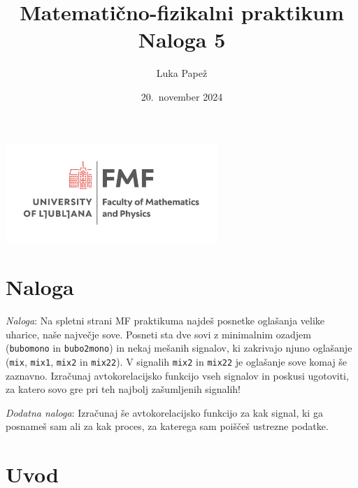\documentclass{article}
\begin{document}
\title{Matematično-fizikalni praktikum \\[3mm] \large Naloga 5}
\author{Luka Papež}
\date{20.\ november 2024}

\begin{center}
    \includegraphics[width=8cm]{logo-fmf.png}
\end{center}

{
    \let\newpage\relax
    \maketitle
}

\maketitle
\newpage
\section{Naloga}

{\it Naloga\/}: Na spletni strani MF praktikuma najdeš posnetke
oglašanja velike uharice, naše največje sove.  Posneti sta
dve sovi z minimalnim ozadjem ({\tt bubomono} in {\tt bubo2mono})
in nekaj mešanih signalov, ki zakrivajo njuno oglašanje
({\tt mix}, {\tt mix1}, {\tt mix2} in {\tt mix22}).
V signalih {\tt mix2} in {\tt mix22} je oglašanje sove
komaj še zaznavno.  Izračunaj avtokorelacijsko funkcijo 
vseh signalov in poskusi ugotoviti, za katero sovo gre
pri teh najbolj zašumljenih signalih!

\bigskip

{\it Dodatna naloga\/}: Izračunaj še avtokorelacijsko funkcijo
za kak signal, ki ga posnameš sam ali za kak proces, za katerega
sam poiščeš ustrezne podatke.
\section{Uvod}
\end{document}
